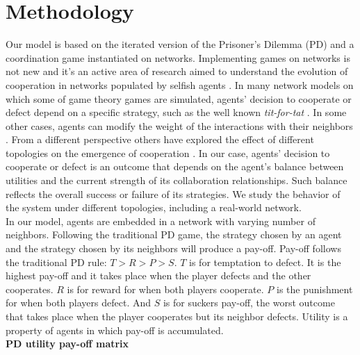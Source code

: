 \documentclass[11pt]{article}
\begin{document}
\section{Methodology}
\label{sec:2}

Our model is based on the iterated version of the Prisoner's Dilemma (PD) and a
coordination game instantiated on
networks. Implementing games on networks is not new and it's an active area of
research aimed to understand the evolution of cooperation in networks populated
by selfish agents \cite{Szabo2007,Nowak1992,Nowak2006,Santos2005,Santos2006}. In many network models
on which some of game theory games are simulated, agents' decision to cooperate
or defect depend on a specific strategy, such as the well known
\textit{tit-for-tat} \cite{Axelrod2006,Nowak2011}. In some other cases, agents
can modify the weight of the interactions with their neighbors
\cite{Santos2006}. From a different perspective others have explored the effect
of different topologies on the emergence of cooperation
\cite{Santos2005,Hauert2004}. {\color{red}In our case, agents' decision to cooperate or
defect is an outcome that depends on the agent's balance between
utilities and the current strength of its collaboration relationships. Such
balance reflects the overall success or failure of its strategies}. We
study the behavior of the system under different topologies, including a
real-world network.\\  
  

In our model, agents are embedded in a network with varying number of
neighbors. Following the traditional PD game, the strategy chosen by an agent
and the strategy chosen by its neighbors will produce a pay-off. Pay-off follows
the traditional PD rule: $T > R > P > S$. $T$ is for temptation to defect. It is the highest
pay-off and it takes place when the player defects and the other cooperates. $R$
is for reward for when both players cooperate. $P$ is the punishment for when
both players defect. And $S$ is for suckers pay-off, the worst outcome that
takes place when the player cooperates but its neighbor defects. Utility is a
property of agents in which pay-off is accumulated.\\   

{\bf PD utility pay-off matrix}\\
\end{document}
